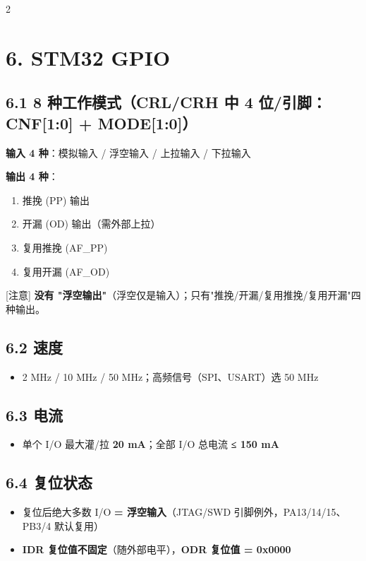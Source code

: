 \documentclass[UTF8,zihao=-5]{ctexart}
\newcommand{\hint}[1]{{\color{gray!35!black}\footnotesize #1}}
\begin{document}
\begin{multicols*}{2}
\section*{6. STM32 GPIO}
\subsection*{6.1 8 种工作模式（CRL/CRH 中 4 位/引脚：CNF[1:0] + MODE[1:0]）}
\textbf{输入 4 种}：模拟输入 / 浮空输入 / 上拉输入 / 下拉输入\par
\textbf{输出 4 种}：\par
\begin{enumerate}
\item 推挽 (PP) 输出
\item 开漏 (OD) 输出（需外部上拉）
\item 复用推挽 (AF\_PP)
\item 复用开漏 (AF\_OD)
\end{enumerate}
\hint{[注意] \textbf{没有 "浮空输出"}（浮空仅是输入）；只有"推挽/开漏/复用推挽/复用开漏"四种输出。}\par
\subsection*{6.2 速度}
\begin{itemize}
\item 2 MHz / 10 MHz / 50 MHz；高频信号（SPI、USART）选 50 MHz
\end{itemize}
\subsection*{6.3 电流}
\begin{itemize}
\item 单个 I/O 最大灌/拉 \textbf{20 mA}；全部 I/O 总电流 \textbf{≤ 150 mA}
\end{itemize}
\subsection*{6.4 复位状态}
\begin{itemize}
\item 复位后绝大多数 I/O \textbf{= 浮空输入}（JTAG/SWD 引脚例外，PA13/14/15、PB3/4 默认复用）
\item \textbf{IDR 复位值不固定}（随外部电平），\textbf{ODR 复位值 = 0x0000}
\end{itemize}

\end{multicols*}
\end{document}
